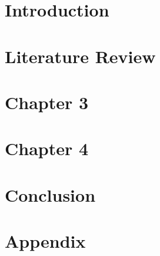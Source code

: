 \documentclass[11pt]{book}
\begin{document}
\mastersthesis

% 
% 

% 
\chapter{Introduction}
\label{ch:intro}

\chapter{Literature Review}
\label{ch:lit_review}


\chapter{Chapter 3}
\label{ch:ch1}


\chapter{Chapter 4}
\label{ch:ch2}


\chapter{Conclusion}
\label{ch:conc}



\printbibliography %
\chapter{Appendix}
\label{ch:appendix}

\end{document}
